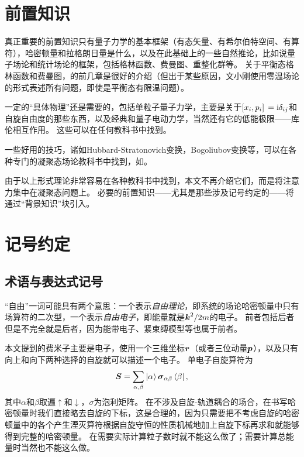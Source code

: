 \section*{前置知识}

真正重要的前置知识只有量子力学的基本框架（有态矢量、有希尔伯特空间、有算符），哈密顿量和拉格朗日量是什么，以及在此基础上的一些自然推论，比如说量子场论和统计场论的框架，包括格林函数、费曼图、重整化群等。
关于平衡态格林函数和费曼图，\cite{wen-qft}的前几章是很好的介绍（但出于某些原因，文小刚使用零温场论的形式表述所有问题，即使是平衡态有限温问题）。

一定的“具体物理”还是需要的，包括单粒子量子力学，主要是关于$\comm*{x_i}{p_i} = \ii \delta_{ij}$和自旋自由度的那些东西，以及经典和量子电动力学，当然还有它的低能极限——库伦相互作用。
这些可以在任何教科书中找到。

一些好用的技巧，诸如Hubbard-Stratonovich变换，Bogoliubov变换等，可以在各种专门的凝聚态场论教科书中找到，如\cite{altland2010condensed}。

由于以上形式理论非常容易在各种教科书中找到，本文不再介绍它们，而是将注意力集中在凝聚态问题上。
必要的前置知识——尤其是那些涉及记号约定的——将通过“背景知识”块引入。

\section*{记号约定}

\subsection*{术语与表达式记号}

“自由”一词可能具有两个意思：一个表示\emph{自由理论}，即系统的场论哈密顿量中只有场算符的二次型，一个表示\emph{自由电子}，即能量就是$\vb*{k}^2/2m$的电子。
前者包括后者但是不完全就是后者，因为能带电子、紧束缚模型等也属于前者。

本文提到的费米子主要是电子，使用一个三维坐标$\vb*{r}$（或者三位动量$\vb*{p}$），以及只有向上和向下两种选择的自旋就可以描述一个电子。
单电子自旋算符为
\begin{equation}
    {\vb*{S}} = \sum_{\alpha, \beta} \ket{\alpha} \vb*{\sigma}_{\alpha \beta} \bra{\beta},
\end{equation}
其中$\alpha$和$\beta$取遍$\uparrow$和$\downarrow$，$\sigma$为泡利矩阵。
在不涉及自旋-轨道耦合的场合，在书写哈密顿量时我们直接略去自旋的下标，这是合理的，因为只需要把不考虑自旋的哈密顿量中的各个产生湮灭算符根据自旋守恒的性质机械地加上自旋下标再求和就能够得到完整的哈密顿量。
在需要实际计算粒子数时就不能这么做了；需要计算总能量时当然也不能这么做。

